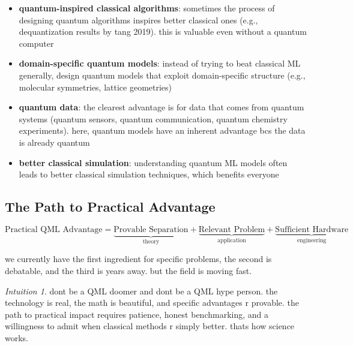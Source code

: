 \documentclass[11pt,a4paper]{article}
\theoremstyle{definition}
\theoremstyle{remark}
\newtheorem*{intuition}{Intuition}
\begin{document}
\begin{itemize}
    \item \textbf{quantum-inspired classical algorithms}: sometimes the process of designing quantum algorithms inspires better classical ones (e.g., dequantization results by tang 2019). this is valuable even without a quantum computer

    \item \textbf{domain-specific quantum models}: instead of trying to beat classical ML generally, design quantum models that exploit domain-specific structure (e.g., molecular symmetries, lattice geometries)

    \item \textbf{quantum data}: the clearest advantage is for data that comes from quantum systems (quantum sensors, quantum communication, quantum chemistry experiments). here, quantum models have an inherent advantage bcs the data is already quantum

    \item \textbf{better classical simulation}: understanding quantum ML models often leads to better classical simulation techniques, which benefits everyone
\end{itemize}

\subsection{The Path to Practical Advantage}

\begin{equation}
    \text{Practical QML Advantage} = \underbrace{\text{Provable Separation}}_{\text{theory}} + \underbrace{\text{Relevant Problem}}_{\text{application}} + \underbrace{\text{Sufficient Hardware}}_{\text{engineering}}
\end{equation}

we currently have the first ingredient for specific problems, the second is debatable, and the third is years away. but the field is moving fast.

\begin{intuition}
dont be a QML doomer and dont be a QML hype person. the technology is real, the math is beautiful, and specific advantages r provable. the path to practical impact requires patience, honest benchmarking, and a willingness to admit when classical methods r simply better. thats how science works.
\end{intuition}

\end{document}
